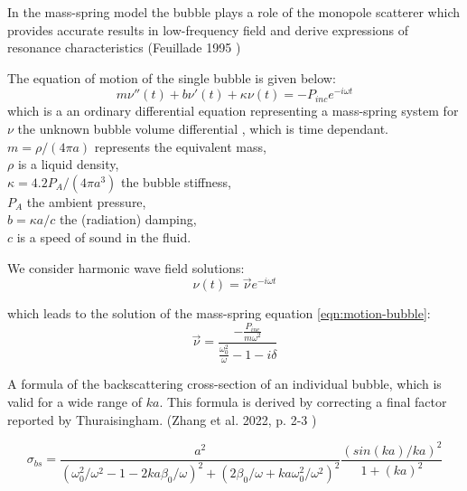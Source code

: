 \documentclass[11pt]{article}
\begin{document}
    In the mass-spring model the bubble plays a role of the monopole scatterer which provides accurate results in low-frequency field and derive expressions of resonance characteristics (Feuillade 1995 \cite{feuillade_scattering_1995})

    The equation of motion of the single bubble is given below: 
    \begin{equation}
        m\nu''(t)+b\nu'(t)+\kappa\nu(t)=-P_{inc}e^{-i\omega t}
        \label{eqn:motion-bubble}
    \end{equation}
    which is a an ordinary differential equation representing a mass-spring system for $\nu$ the unknown bubble volume differential \cite{leighton_acoustic_2012}, which is time dependant. \\
    $m=\rho/(4\pi a)$ represents the equivalent mass, \\
    $\rho $ is a liquid density, \\
    $\kappa = 4.2 P_A/(4\pi a^3)$ the bubble stiffness,\\
    $P_A$ the ambient pressure,\\
    $b=\kappa a/c$ the (radiation) damping,\\
    $c$ is a speed of sound in the fluid.

    We consider harmonic wave field solutions:
    \begin{equation}
        \nu(t)=\vec{\nu}e^{-i\omega t}
    \end{equation}

    which leads to the solution of the mass-spring equation \ref{eqn:motion-bubble}:
    \begin{equation}
        \vec{\nu}=\frac{-\frac{P_{inc}}{m\omega^2}}{\frac{\omega_0^2}{\omega}-1-i\delta}
    \end{equation}
	
	A formula of the backscattering cross-section of an individual bubble, which is valid for a wide range of $ka$. This formula is derived by correcting a final factor reported by Thuraisingham. (Zhang et al. 2022, p. 2-3 \cite{zhang_efficient_2022} )

\begin{equation}\label{eq:volume_backscattering_strength }
	\sigma_{bs} =\frac{a^{2} }{ (\omega_{0}^{2}/\omega^{2} -1 -2ka\beta_{0}/\omega )^{2} + (2\beta_{0}/\omega + ka\omega_{0}^{2}/\omega^{2})^{2} } \frac{(sin(ka)/ka)^{2}}{1+(ka)^{2}}
\end{equation}
\end{document}
